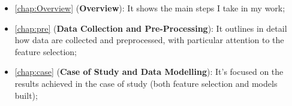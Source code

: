 \begin{itemize}
  \item \autoref{chap:Overview} (\textbf{Overview}): It shows the main steps I take in my work;
  \item \autoref{chap:pre} (\textbf{Data Collection and Pre-Processing}): It outlines in detail how data are collected and preprocessed, with particular attention to the feature selection;
  \item \autoref{chap:case} (\textbf{Case of Study and Data Modelling}): It's focused on the results achieved in the case of study (both feature selection and models built);
\end{itemize}
\begin{comment}
Indeed, in recent years ensemble feature selection are being implemented by researchers  
approaches are being developed by researchers. They follow a similar recipe with the well-established ensemble on classification algorithms, which provides better results and robustness than employing single algorithms
\end{comment}



